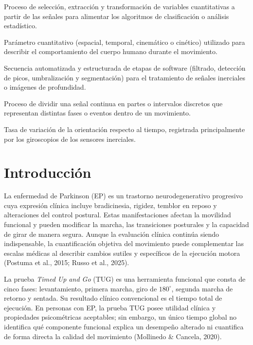 \documentclass[12pt,a4paper]{article}
\newcommand{\termino}[2]{\item[#1] #2}
\begin{document}
\begin{description}[style=nextline,leftmargin=0.8cm,font=\bfseries,itemsep=8pt]
  \termino{Ingeniería de características}{Proceso de selección, extracción y transformación de variables cuantitativas a partir de las señales para alimentar los algoritmos de clasificación o análisis estadístico.}
  \termino{Métrica biomecánica}{Parámetro cuantitativo (espacial, temporal, cinemático o cinético) utilizado para describir el comportamiento del cuerpo humano durante el movimiento.}
  \termino{Pipeline de procesamiento}{Secuencia automatizada y estructurada de etapas de software (filtrado, detección de picos, umbralización y segmentación) para el tratamiento de señales inerciales o imágenes de profundidad.}
  \termino{Segmentación de señales}{Proceso de dividir una señal continua en partes o intervalos discretos que representan distintas fases o eventos dentro de un movimiento.}
  \termino{Velocidad angular}{Tasa de variación de la orientación respecto al tiempo, registrada principalmente por los giroscopios de los sensores inerciales.}
\end{description}
\newpage


\section{Introducción}\label{sec:introduccion}

La enfermedad de Parkinson (EP) es un trastorno neurodegenerativo progresivo cuya expresión clínica incluye bradicinesia, rigidez, temblor en reposo y alteraciones del control postural. Estas manifestaciones afectan la movilidad funcional y pueden modificar la marcha, las transiciones posturales y la capacidad de girar de manera segura. Aunque la evaluación clínica continúa siendo indispensable, la cuantificación objetiva del movimiento puede complementar las escalas médicas al describir cambios sutiles y específicos de la ejecución motora (Postuma et al., 2015; Russo et al., 2025).

La prueba \emph{Timed Up and Go} (TUG) es una herramienta funcional que consta de cinco fases: levantamiento, primera marcha, giro de $180^\circ$, segunda marcha de retorno y sentada. Su resultado clínico convencional es el tiempo total de ejecución. En personas con EP, la prueba TUG posee utilidad clínica y propiedades psicométricas aceptables; sin embargo, un único tiempo global no identifica qué componente funcional explica un desempeño alterado ni cuantifica de forma directa la calidad del movimiento (Mollinedo \& Cancela, 2020).
\end{document}
